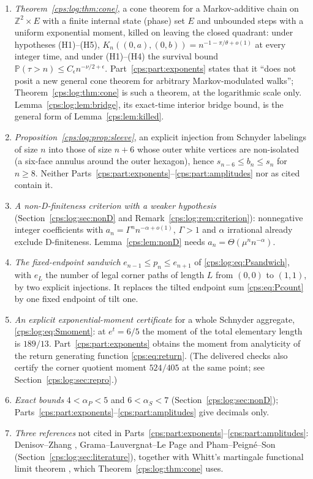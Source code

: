 \documentclass[11pt,letterpaper]{article}
\numberwithin{equation}{section}
\theoremstyle{remark}\newtheorem{remark}[theorem]{Remark}
\newcommand{\PP}{\mathbb P}
\newcommand{\ZZ}{\mathbb Z}
\newcommand{\ap}{\alpha_P}\newcommand{\as}{\alpha_S}
\begin{document}
\begin{enumerate}[label=(\roman*)]
\item \emph{Theorem~\ref{cps:log:thm:cone}}, a cone theorem for a Markov-additive chain on
 $\ZZ^2\times E$ with a finite internal state (phase) set $E$ and unbounded steps with a uniform
 exponential moment, killed on leaving the closed quadrant: under hypotheses (H1)--(H5),
 $K_n((0,a),(0,b))=n^{-1-\pi/\theta+o(1)}$ at every integer time, and under (H1)--(H4) the
 survival bound $\PP(\tau>n)\le C_\epsilon n^{-\nu/2+\epsilon}$. Part~\ref{cps:part:exponents}
 states that it ``does not posit a new general cone theorem for arbitrary Markov-modulated
 walks''; Theorem~\ref{cps:log:thm:cone} is such a theorem, at the logarithmic scale only.
 Lemma~\ref{cps:log:lem:bridge}, its exact-time interior bridge bound, is the general form of
 Lemma~\ref{cps:lem:killed}.
\item \emph{Proposition~\ref{cps:log:prop:sleeve}}, an explicit injection from Schnyder
 labelings of size $n$ into those of size $n+6$ whose outer white vertices are non-isolated (a
 six-face annulus around the outer hexagon), hence $s_{n-6}\le b_n\le s_n$ for $n\ge8$. Neither
 Parts~\ref{cps:part:exponents}--\ref{cps:part:amplitudes} nor \cite{FNS} as cited contain it.
\item \emph{A non-D-finiteness criterion with a weaker hypothesis} (Section~\ref{cps:log:sec:nonD}
 and Remark~\ref{cps:log:rem:criterion}): nonnegative integer coefficients with
 $a_n=\Gamma^nn^{-\alpha+o(1)}$, $\Gamma>1$ and $\alpha$ irrational already exclude
 D-finiteness. Lemma~\ref{cps:lem:nonD} needs $a_n=\Theta(\mu^nn^{-\alpha})$.
\item \emph{The fixed-endpoint sandwich} $e_{n-1}\le p_n\le e_{n+1}$ of
 \eqref{cps:log:eq:Psandwich}, with $e_L$ the number of legal corner paths of length $L$ from
 $(0,0)$ to $(1,1)$, by two explicit injections. It replaces the tilted endpoint sum
 \eqref{cps:eq:Pcount} by one fixed endpoint of tilt one.
\item \emph{An explicit exponential-moment certificate} for a whole Schnyder aggregate,
 \eqref{cps:log:eq:Smoment}: at $e^t=6/5$ the moment of the total elementary length is $189/13$.
 Part~\ref{cps:part:exponents} obtains the moment from analyticity of the return generating
 function \eqref{cps:eq:return}. (The delivered checks also certify the corner quotient
 moment $524/405$ at the same point; see Section~\ref{cps:log:sec:repro}.)
\item \emph{Exact bounds} $4<\ap<5$ and $6<\as<7$ (Section~\ref{cps:log:sec:nonD});
 Parts~\ref{cps:part:exponents}--\ref{cps:part:amplitudes} give decimals only.
\item \emph{Three references} not cited in Parts~\ref{cps:part:exponents}--\ref{cps:part:amplitudes}:
 Denisov--Zhang \cite{DZ}, Grama--Lauvergnat--Le Page \cite{GLLP} and Pham--Peign\'e--Son
 \cite{PPS} (Section~\ref{cps:log:sec:literature}), together with Whitt's martingale functional
 limit theorem \cite{Whitt}, which Theorem~\ref{cps:log:thm:cone} uses.
\end{enumerate}
\end{document}
